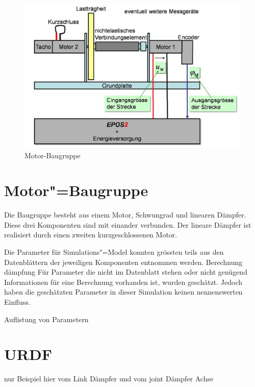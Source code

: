 \begin{figure}[ht!]
	\centering
	\includegraphics[width=14.5cm]{images/motor_baugruppe.png} %
	\caption{Motor-Baugruppe}
	\label{Ab:motor-baugruppe}
\end{figure}

\section{Motor"=Baugruppe}
Die Baugruppe besteht aus einem Motor, Schwungrad und linearen Dämpfer.
Diese drei Komponenten sind mit einander verbunden.
Der lineare Dämpfer ist realisiert durch einen zweiten kurzgeschlossenen Motor.

Die Parameter für Simulations"=Model konnten grössten teils aus den Datenblättern der jeweiligen Komponenten entnommen werden. %
Berechnung dämpfung
Für Parameter die nicht im Datenblatt stehen oder nicht genügend Informationen für eine Berechnung vorhanden ist, wurden geschätzt.
Jedoch haben die geschätzten Parameter in dieser Simulation keinen nennenswerten Einfluss.

Auflistung von Parametern







\section{URDF}
nur Beispiel hier vom Link Dämpfer und vom joint Dämpfer Achse

